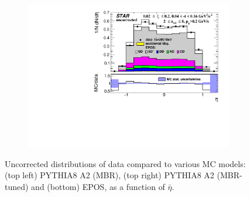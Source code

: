 \begin{figure}[H]
\begin{subfigure}{.45\textwidth}
		\includegraphics[width=\linewidth, page=1]{chapters/chrgSTAR/img/nonSD/chrg/SDT_epos_xi0_RP_starsim_eta.pdf}
	\end{subfigure}
	\begin{minipage}{.45\textwidth}
		\caption{Uncorrected distributions of data compared to various MC models: (top left) PYTHIA8 A2 (MBR), (top right) PYTHIA8 A2 (MBR-tuned) and (bottom) EPOS, as a function of $\bar{\eta}$. }
		\label{fig:nonSDera}
	\end{minipage}
	
\end{figure}
